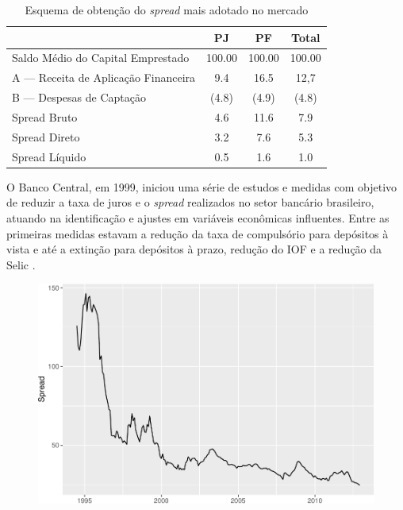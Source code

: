 \documentclass[12pt,openright,oneside,a4paper,chapter=TITLE,section=TITLE,subsection=Title,english,french,spanish,portugues,sumario=tradicional]{04-class-files/abntex2}
\begin{document}
\begin{table}
 \centering
   \caption{Esquema de obtenção do \emph{spread} mais adotado no mercado} 
    \label{tab:spread.tb}
     \begin{tabular}{l|c|c|c}
      \hline
                                           &   PJ   &   PF    & Total \\
       \hline
       Saldo Médio do Capital Emprestado   & 100.00 & 100.00  & 100.00 \\
       A — Receita de Aplicação Financeira & 9.4    & 16.5    & 12,7   \\
       B — Despesas de Captação            & (4.8)  & (4.9)   & (4.8)  \\   
       Spread Bruto                        & 4.6    & 11.6    & 7.9    \\
       Spread Direto                       & 3.2    & 7.6     & 5.3    \\
       Spread Líquido                      & 0.5    & 1.6     & 1.0    \\
       \hline
       \end{tabular}
\end{table}

O Banco Central, em 1999, iniciou uma série de estudos e medidas com objetivo
de reduzir a taxa de juros e o \emph{spread} realizados no setor bancário
brasileiro, atuando na identificação e ajustes em variáveis econômicas
influentes. Entre as primeiras medidas estavam a redução da taxa de compulsório
para depósitos à vista e até a extinção para depósitos à prazo, redução do IOF
e a redução da Selic \cite{BCB:2000}.

\begin{figure}

\begin{center}\includegraphics{12-exportedfigures/average spread-1} \end{center}
\label{fig:spread2012}
\end{figure}
\end{document}
